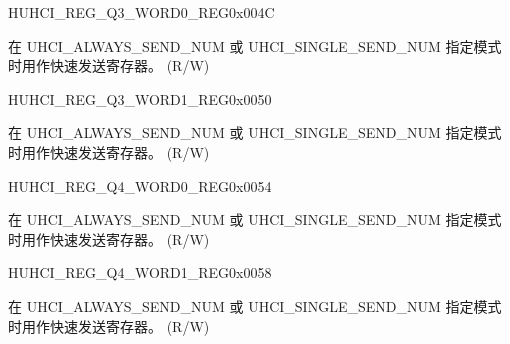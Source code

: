 \begin{register}{H}{UHCI\_REG\_Q3\_WORD0\_REG}{0x004C}\label{regdesc:UHCIREGQ3WORD0REG}
%
\regnewline%
\begin{regdesc}\begin{reglist}
\label{fielddesc:UHCISENDQ3WORD0}\item [UHCI\_SEND\_Q3\_WORD0] 在 UHCI\_ALWAYS\_SEND\_NUM 或 UHCI\_SINGLE\_SEND\_NUM 指定模式时用作快速发送寄存器。 (R/W)
\end{reglist}\end{regdesc}
\end{register}


\begin{register}{H}{UHCI\_REG\_Q3\_WORD1\_REG}{0x0050}\label{regdesc:UHCIREGQ3WORD1REG}
%
\regnewline%
\begin{regdesc}\begin{reglist}
\label{fielddesc:UHCISENDQ3WORD1}\item [UHCI\_SEND\_Q3\_WORD1] 在 UHCI\_ALWAYS\_SEND\_NUM 或 UHCI\_SINGLE\_SEND\_NUM 指定模式时用作快速发送寄存器。 (R/W)
\end{reglist}\end{regdesc}
\end{register}


\begin{register}{H}{UHCI\_REG\_Q4\_WORD0\_REG}{0x0054}\label{regdesc:UHCIREGQ4WORD0REG}
%
\regnewline%
\begin{regdesc}\begin{reglist}
\label{fielddesc:UHCISENDQ4WORD0}\item [UHCI\_SEND\_Q4\_WORD0] 在 UHCI\_ALWAYS\_SEND\_NUM 或 UHCI\_SINGLE\_SEND\_NUM 指定模式时用作快速发送寄存器。 (R/W)
\end{reglist}\end{regdesc}
\end{register}


\begin{register}{H}{UHCI\_REG\_Q4\_WORD1\_REG}{0x0058}\label{regdesc:UHCIREGQ4WORD1REG}
%
\regnewline%
\begin{regdesc}\begin{reglist}
\label{fielddesc:UHCISENDQ4WORD1}\item [UHCI\_SEND\_Q4\_WORD1] 在 UHCI\_ALWAYS\_SEND\_NUM 或 UHCI\_SINGLE\_SEND\_NUM 指定模式时用作快速发送寄存器。 (R/W)
\end{reglist}\end{regdesc}
\end{register}


